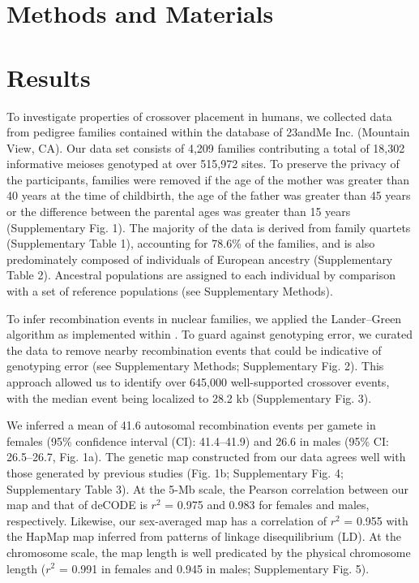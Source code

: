 \section{Methods and Materials}

\section{Results}

To investigate properties of crossover placement in humans, we
collected data from pedigree families contained within the
database of 23andMe Inc. (Mountain View, CA). Our data set
consists of 4,209 families contributing a total of 18,302
informative meioses genotyped at over 515,972 sites. To preserve
the privacy of the participants, families were removed if the age of
the mother was greater than 40 years at the time of childbirth,
the age of the father was greater than 45 years or the difference
between the parental ages was greater than 15 years
(Supplementary Fig. 1). The majority of the data is derived from
family quartets (Supplementary Table 1), accounting for 78.6\% of
the families, and is also predominately composed of individuals of
European ancestry (Supplementary Table 2). Ancestral populations
are assigned to each individual by comparison with a set of
reference populations (see Supplementary Methods).

To infer recombination events in nuclear families, we applied
the Lander–Green algorithm as implemented within \citet{Abecasis2002}.
To guard against genotyping error, we curated the data to remove
nearby recombination events that could be indicative of
genotyping error (see Supplementary Methods; Supplementary
Fig. 2). This approach allowed us to identify over 645,000 
well-supported crossover events, with the median event being localized
to 28.2 kb (Supplementary Fig. 3).

We inferred a mean of 41.6 autosomal recombination events
per gamete in females (95\% confidence interval (CI): 41.4–41.9)
and 26.6 in males (95\% CI: 26.5–26.7, Fig. 1a). The genetic map
constructed from our data agrees well with those generated by
previous studies (Fig. 1b; Supplementary Fig. 4; Supplementary
Table 3). At the 5-Mb scale, the Pearson correlation between our
map and that of deCODE\cite{Kong2010} is $r^2$ = 0.975 and 0.983 for females and
males, respectively. Likewise, our sex-averaged map has a
correlation of $r^2$ = 0.955 with the HapMap map inferred from
patterns of linkage disequilibrium (LD)\cite{hapmap2007}. At the chromosome
scale, the map length is well predicated by the physical
chromosome length ($r^2$ = 0.991 in females and 0.945 in males;
Supplementary Fig. 5).

